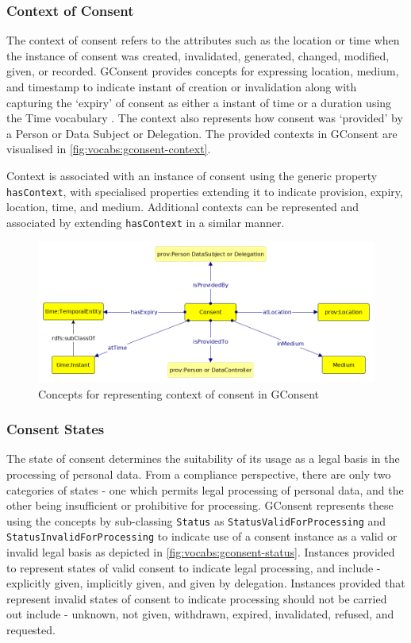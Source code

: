 \subsubsection{Context of Consent}
The context of consent refers to the attributes such as the location or time when the instance of consent was created, invalidated, generated, changed, modified, given, or recorded.
GConsent provides concepts for expressing location, medium, and timestamp to indicate instant of creation or invalidation along with capturing the `expiry' of consent as either a instant of time or a duration using the Time vocabulary \cite{cox_time_2017}. The context also represents how consent was `provided' by a Person or Data Subject or Delegation. 
The provided contexts in GConsent are visualised in \autoref{fig:vocabs:gconsent-context}.

Context is associated with an instance of consent using the generic property \texttt{hasContext}, with specialised properties extending it to indicate provision, expiry, location, time, and medium. 
Additional contexts can be represented and associated by extending \texttt{hasContext} in a similar manner.
\begin{figure}[htbp]
    \centering
    \includegraphics[width=0.8\linewidth]{img/gconsent_context.png}
    \caption{Concepts for representing context of consent in GConsent \cite{pandit_gconsent_2019}}
    \label{fig:vocabs:gconsent-context}
\end{figure}

\subsubsection{Consent States}
The state of consent determines the suitability of its usage as a legal basis in the processing of personal data.
From a compliance perspective, there are only two categories of states - one which permits legal processing of personal data, and the other being insufficient or prohibitive for  processing.
GConsent represents these using the concepts by sub-classing \texttt{Status} as \texttt{StatusValidForProcessing} and \texttt{StatusInvalidForProcessing} to indicate use of a consent instance as a valid or invalid legal basis as depicted in \autoref{fig:vocabs:gconsent-status}.
Instances provided to represent states of valid consent to indicate legal processing, and include - explicitly given, implicitly given, and given by delegation.
Instances provided that represent invalid states of consent to indicate processing should not be carried out include - unknown, not given, withdrawn, expired, invalidated, refused, and requested.

